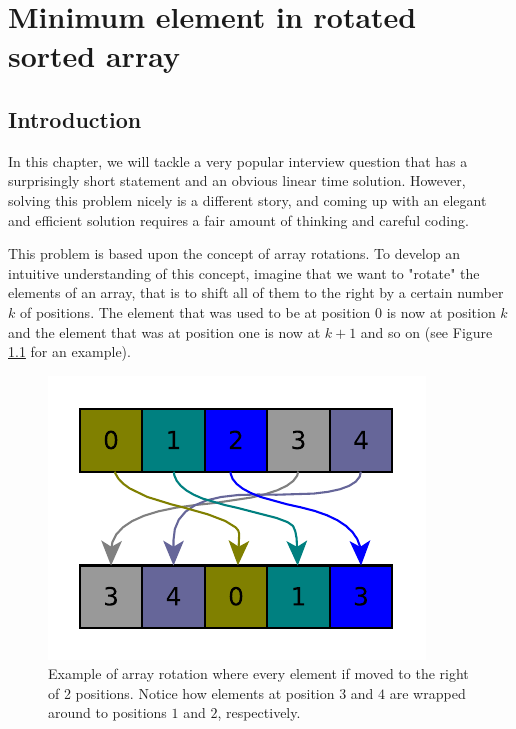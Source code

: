 %

\chapter{Minimum element in rotated sorted array}
\label{ch:min_rotated_array}
\section*{Introduction}
In this chapter, we will tackle a very popular interview question that has a surprisingly short statement and an obvious linear time solution. However, solving this problem nicely is a different story, and coming up with an elegant and efficient solution requires a fair amount of thinking and careful coding.

This problem is based upon the concept of array rotations. To develop an intuitive understanding of this concept, imagine that we want to "rotate" the elements of an array, that is to shift all of them to the right by a certain number $k$ of positions. The element that was used to be at position $0$ is now at position $k$ and the element that was at position one is now at $k+1$ and so on (see Figure \ref{fig:min_rotated_array:arrayrotation} for an example).

\begin{figure}
	\centering
	\includegraphics{sources/min_rotated_array/images/arrayrotation}
	\caption{Example of array rotation where every element if moved to the right of 2 positions. Notice how elements at position $3$ and $4$ are wrapped around to positions $1$ and $2$, respectively.}
	\label{fig:min_rotated_array:arrayrotation}
\end{figure}



